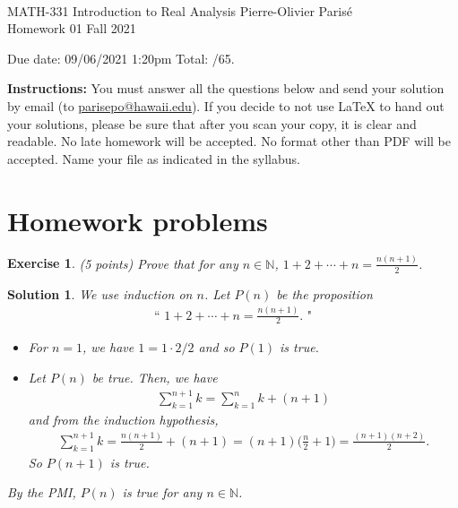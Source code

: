 \documentclass[12pt]{article}
\newcommand{\bN}{\mathbb{N}}
\theoremstyle{plain}
\newtheorem{exer}{\textbf{Exercise}}}
\theoremstyle{plain}
\newtheorem*{sol}{\textbf{Solution}}}
\theoremstyle{plain}
\theoremstyle{plain}
\begin{document}
	\noindent \hrulefill \\
	MATH-331 Introduction to Real Analysis \hfill Pierre-Olivier Paris{\'e}\\
	Homework 01 \hfill Fall 2021\\\vspace*{-0.7cm}
	
	\noindent\hrulefill
	
	\noindent Due date: 09/06/2021 1:20pm \hfill Total: \hspace{0.3cm}/65.
	
\vspace*{1cm}

{\bf Instructions:} You must answer all the questions below and send your solution by email (to \url{parisepo@hawaii.edu}). If you decide to not use {\LaTeX} to hand out your solutions, please be sure that after you scan your copy, it is clear and readable. No late homework will be accepted. No format other than PDF will be accepted. Name your file as indicated in the syllabus.

\section{Homework problems}
\begin{exer}
(5 points) Prove that for any $n \in \bN$, $1 + 2 + \cdots + n = \frac{n(n + 1)}{2}$.
\end{exer}
\begin{sol}
We use induction on $n$. Let $P(n)$ be the proposition
	\begin{align*}
	\text{`` } 1 + 2 + \cdots + n = \frac{n (n + 1)}{2} \text{. "}
	\end{align*}
	\begin{itemize}
	\item For $n = 1$, we have $1 = 1\cdot 2/2$ and so $P(1)$ is true.
	\item Let $P(n)$ be true. Then, we have
		\begin{align*}
		\sum_{k = 1}^{n + 1} k = \sum_{k = 1}^n k + (n + 1)
		\end{align*}
	and from the induction hypothesis,
		\begin{align*}
		\sum_{k = 1}^{n + 1} k = \frac{n(n + 1)}{2} + (n + 1) = (n + 1) \Big( \frac{n}{2} + 1 \Big) = \frac{(n + 1)(n + 2)}{2}.
		\end{align*}
	So $P(n + 1)$ is true.
	\end{itemize}
By the PMI, $P(n)$ is true for any $n \in \bN$.
\end{sol}
\end{document}
